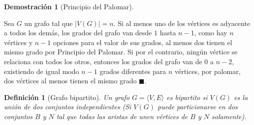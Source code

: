 \documentclass[a4paper,1pt]{report}
\newtheorem*{dem}{Demostración}
\newtheorem*{dfn}{Definición}
\begin{document}
\begin{dem}[Principio del Palomar]\end{dem}
Sea $G$ un grafo tal que $|V(G)| = n$. Si al menos uno de los v\'ertices es adyacente a todos los dem\'as, los grados del grafo van desde $1$ hasta $n-1$, como hay $n$ v\'ertices y $n-1$ opciones para el valor de sus grados, al menos dos tienen el mismo grado por Principio del Palomar. Si por el contrario, ning\'un v\'ertice se relaciona con todos los otros, entonces los grados del grafo van de $0$ a $n-2$, existiendo de igual modo $n-1$ grados diferentes para $n$ v\'ertices, por palomar, dos v\'ertices al menos tienen el mismo grado $\blacksquare$.


\begin{dfn}[Grafo bipartito]
    Un grafo  $G = \langle V, E \rangle$ es bipartito si $V(G)$ es la unión de dos conjuntos independientes (Si $V(G)$ puede particionarse en dos conjuntos $B$ y $N$ tal que todas las aristas de unen vértices de $B$ y $N$ solamente).
\end{dfn}
\end{document}
